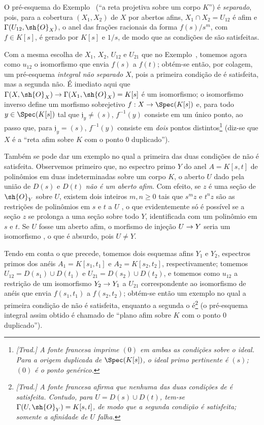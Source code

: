\documentclass[oneside]{amsart}
\makeatletter
\renewcommand{\geq}{\geqslant}
\newcommand{\ega@arrow}[2]{\mathchoice{#1}{#2}{#2}{#2}}
\renewcommand{\to}{\ega@arrow{\longrightarrow}{\rightarrow}}
\let\EGAOriginalLabel\label
\renewcommand{\label}[1]{\phantomsection\EGAOriginalLabel{#1}}
\makeatother
\begin{document}
\begin{examples}[5.5.11]
\label{I.5.5.11}
O pré-esquema do Exemplo~ (``a reta projetiva sobre um corpo
$K$'') é \emph{separado}, pois, para a cobertura $(X_1,X_2)$ de $X$ por
abertos afins, $X_1\cap X_2=U_{12}$ é afim e
$\Gamma(U_{12},\sh{O}_X)$, o anel das frações racionais da forma
$f(s)/s^m$, com $f\in K[s]$, é gerado por $K[s]$ e $1/s$, de modo que as
condições de  são satisfeitas.

Com a mesma escolha de $X_1$, $X_2$, $U_{12}$ e $U_{21}$ que no
Exemplo~, tomemos agora como $u_{12}$ o isomorfismo que envia
$f(s)$ a $f(t)$;
obtém-se então, por colagem, um pré-esquema \emph{integral não separado} $X$,
pois a primeira condição de  é satisfeita, mas a segunda não.
É imediato aqui que
$\Gamma(X,\sh{O}_X)\to\Gamma(X_1,\sh{O}_X)=K[s]$ é um isomorfismo;
o isomorfismo inverso define um morfismo sobrejetivo
$f:X\to\Spec(K[s])$ e, para todo $y\in\Spec(K[s])$ tal que
$\mathfrak{j}_y\neq(s)$, $f^{-1}(y)$ consiste em um único ponto, ao passo que,
para $\mathfrak{j}_y=(s)$, $f^{-1}(y)$ consiste em \emph{dois} pontos
distintos\footnote{\emph{[Trad.] A fonte francesa imprime $(0)$ em ambas as
condições sobre o ideal. Para a origem duplicada de $\Spec(K[s])$, o ideal
primo pertinente é $(s)$; $(0)$ é o ponto genérico.}} (diz-se que $X$ é a
``reta afim sobre $K$ com o ponto $0$ duplicado'').

Também se pode dar um exemplo no qual a primeira das duas condições de
 não é satisfeita.
Observemos primeiro que, no espectro primo $Y$ do anel $A=K[s,t]$ de
polinômios em duas indeterminadas sobre um corpo $K$, o aberto $U$ dado pela
união de $D(s)$ e $D(t)$ \emph{não é um aberto afim}.
Com efeito, se $z$ é uma seção de $\sh{O}_Y$ sobre $U$, existem dois inteiros
$m,n\geq0$ tais que $s^mz$ e $t^nz$ são as restrições de polinômios em $s$ e
$t$ a $U$ , o que evidentemente só é possível se a seção $z$ se
prolonga a uma seção sobre todo $Y$, identificada com um polinômio em $s$ e
$t$.
Se $U$ fosse um aberto afim, o morfismo de injeção $U\to Y$ seria um
isomorfismo , o que é absurdo, pois $U\neq Y$.

Tendo em conta o que precede, tomemos dois esquemas afins $Y_1$ e $Y_2$,
espectros primos dos anéis $A_1=K[s_1,t_1]$ e $A_2=K[s_2,t_2]$,
respectivamente;
tomemos $U_{12}=D(s_1)\cup D(t_1)$ e $U_{21}=D(s_2)\cup D(t_2)$, e tomemos
como $u_{12}$ a restrição de um isomorfismo $Y_2\to Y_1$ a $U_{21}$
correspondente ao isomorfismo de anéis que envia $f(s_1,t_1)$ a
$f(s_2,t_2)$;
obtém-se então um exemplo no qual a primeira condição de  não é
satisfeita, enquanto a segunda o é\footnote{\emph{[Trad.] A fonte francesa
afirma que nenhuma das duas condições de  é satisfeita.
Contudo, para $U=D(s)\cup D(t)$, tem-se
$\Gamma(U,\sh{O}_Y)=K[s,t]$, de modo que a segunda condição é satisfeita;
somente a afinidade de $U$ falha.}} (o pré-esquema integral assim obtido é
chamado de ``plano afim sobre $K$ com o ponto $0$ duplicado'').
\end{examples}
\end{document}
